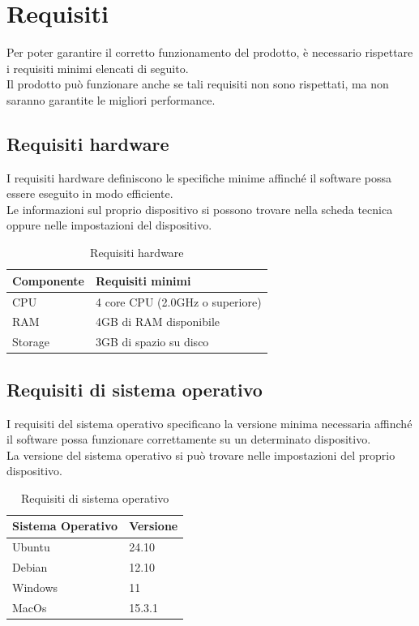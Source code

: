 \section{Requisiti}
Per poter garantire il corretto funzionamento del prodotto, è necessario rispettare i requisiti minimi elencati di seguito.\\
Il prodotto può funzionare anche se tali requisiti non sono rispettati, ma non saranno garantite le migliori performance.

\subsection{Requisiti hardware}
I requisiti hardware definiscono le specifiche minime affinché il software possa essere eseguito in modo efficiente.\\
Le informazioni sul proprio dispositivo si possono trovare nella scheda tecnica oppure nelle impostazioni del dispositivo.

\begin{table}[H]
	\centering
	\renewcommand{\arraystretch}{1.15}
		\begin{tabular}{|p{}|p{}|}
			\hline
			\rowcolor[gray]{0.9}
			\textbf{Componente} & \textbf{Requisiti minimi} \\
			\hline
			CPU & 4 core CPU (2.0GHz o superiore) \\
			\hline
			RAM & 4GB di RAM disponibile \\
			\hline
			Storage & 3GB di spazio su disco \\
			\hline
	\end{tabular}
	\caption{Requisiti hardware}
\end{table}

\subsection{Requisiti di sistema operativo}

I requisiti del sistema operativo specificano la versione minima necessaria affinché il software possa funzionare correttamente su un determinato dispositivo.\\
La versione del sistema operativo si può trovare nelle impostazioni del proprio dispositivo.

\begin{table}[H]
	\centering
	\renewcommand{\arraystretch}{1.15}
		\begin{tabular}{|p{}|p{}|}
			\hline
			\rowcolor[gray]{0.9}
			\textbf{Sistema Operativo} & \textbf{Versione} \\
			\hline
			Ubuntu & 24.10 \\
			\hline
			Debian & 12.10 \\
			\hline
			Windows & 11 \\
			\hline
			MacOs & 15.3.1 \\
			\hline
	\end{tabular}
	\caption{Requisiti di sistema operativo}
\end{table}

